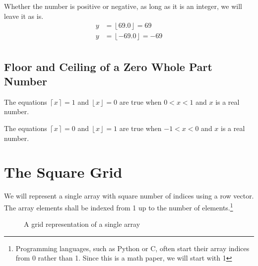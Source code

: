\documentclass[letterpaper, twoside,12pt]{article}
\begin{document}
    Whether the number is positive or negative, as long as it is an integer, we will leave it as is.
    \begin{equation*}
        \begin{split}
            y &= \left\lfloor 69.0 \right\rfloor = 69\\
            y &= \left\lfloor -69.0 \right\rfloor = -69\\
        \end{split}
    \end{equation*}

    \subsection{Floor and Ceiling of a Zero Whole Part Number}
    The equations $\left\lceil x \right\rceil = 1$ and $\left\lfloor x \right\rfloor = 0$ are true when $0 < x < 1$ and $x$ is a real number.

    The equations $\left\lceil x \right\rceil = 0$ and $\left\lfloor x \right\rfloor = 1$ are true when $-1 < x < 0$ and $x$ is a real number.


    \newpage

    \section{The Square Grid} \label{1_square_grid}
    We will represent a single array with square number of indices using a row vector. The array elements shall be indexed from 1 up to the number of elements.\footnote{Programming languages, such as Python or C, often start their array indices from 0 rather than 1. Since this is a math paper, we will start with 1}
    \begin{figure}[ht]
    \centering
    \caption{A grid representation of a single array} \label{1f1}
    \end{figure}
\end{document}
